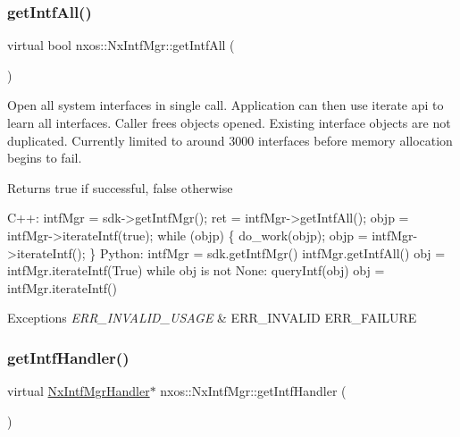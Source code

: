 \subsubsection{\texorpdfstring{get\+Intf\+All()}{getIntfAll()}}
{\footnotesize\ttfamily virtual bool nxos\+::\+Nx\+Intf\+Mgr\+::get\+Intf\+All (\begin{DoxyParamCaption}{ }\end{DoxyParamCaption})\hspace{0.3cm}{\ttfamily [pure virtual]}}

Open all system interfaces in single call. Application can then use iterate api to learn all interfaces. Caller frees objects opened. Existing interface objects are not duplicated. Currently limited to around 3000 interfaces before memory allocation begins to fail.

\begin{DoxyReturn}{Returns}
true if successful, false otherwise
\end{DoxyReturn}

\begin{DoxyCode}
C++:
   intfMgr = sdk->getIntfMgr();
   ret = intfMgr->getIntfAll();
   objp = intfMgr->iterateIntf(\textcolor{keyword}{true});
   \textcolor{keywordflow}{while} (objp) \{
        do\_work(objp);
        objp = intfMgr->iterateIntf();
    \}
Python:
   intfMgr = sdk.getIntfMgr()
   intfMgr.getIntfAll()  
   obj = intfMgr.iterateIntf(True)
   \textcolor{keywordflow}{while} obj is not None:
      queryIntf(obj)
      obj = intfMgr.iterateIntf()
\end{DoxyCode}



\begin{DoxyExceptions}{Exceptions}
{\em E\+R\+R\+\_\+\+I\+N\+V\+A\+L\+I\+D\+\_\+\+U\+S\+A\+GE} & E\+R\+R\+\_\+\+I\+N\+V\+A\+L\+ID E\+R\+R\+\_\+\+F\+A\+I\+L\+U\+RE \\
\hline
\end{DoxyExceptions}
\mbox{\label{classnxos_1_1_nx_intf_mgr_af3fff8d1738bc43b2441a8b868984665}} 
\subsubsection{\texorpdfstring{get\+Intf\+Handler()}{getIntfHandler()}}
{\footnotesize\ttfamily virtual \mbox{\hyperlink{classnxos_1_1_nx_intf_mgr_handler}{Nx\+Intf\+Mgr\+Handler}}$\ast$ nxos\+::\+Nx\+Intf\+Mgr\+::get\+Intf\+Handler (\begin{DoxyParamCaption}{ }\end{DoxyParamCaption})\hspace{0.3cm}{\ttfamily [pure virtual]}}

